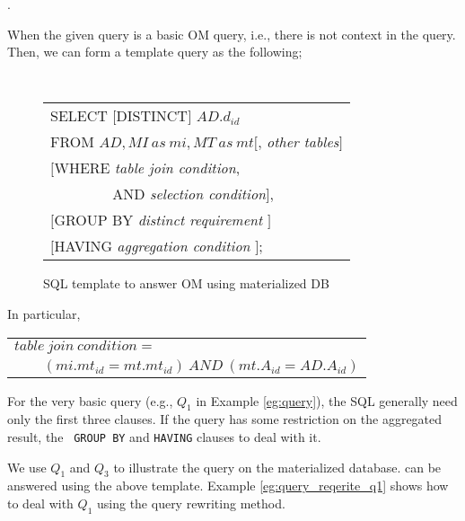 . 

When the given query is a basic OM query, i.e., there is not context
in the query. 
Then, we can form a template query as the following;

\begin{figure}[htb]
{\tt
\begin{tabular}{l}
SELECT $[$DISTINCT$]$ $AD.d_{id}$\\
FROM $AD, MI~as~mi, MT~as~mt[$, {\em other tables}$]$\\
$[$WHERE    {\em table join condition}, \\
$\qquad\qquad$ AND {\em selection condition}$]$,\\
$[$GROUP BY {\em distinct requirement} $]$\\
$[$HAVING   {\em aggregation condition} $]$;
\end{tabular}
}
\caption{SQL template to answer OM using materialized DB}
\label{fig:sql_matdb_basic_omq}
\end{figure}

In particular, 

\vspace{0.1in}
\begin{tabular}{l}
$table~join~condition=$\\
$\qquad (mi.mt_{id}=mt.mt_{id})~AND~(mt.A_{id}=AD.A_{id})$
\end{tabular}
\vspace{0.1in}

For the very basic query (e.g., $Q_1$ in Example \ref{eg:query}), the
SQL generally need only the first three clauses. 
If the query has some restriction on the aggregated result, the {\tt
  GROUP BY} and {\tt HAVING} clauses to deal with it. 

We use $Q_1$ and $Q_3$ to illustrate the query on the materialized
database. 
can be answered using the above
template. 
Example \ref{eg:query_reqerite_q1} shows how to deal with $Q_1$ using
the query rewriting method. 

